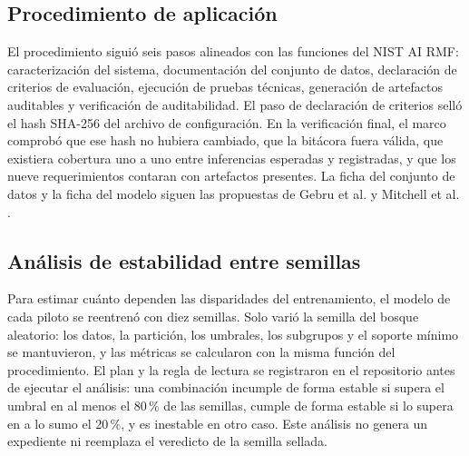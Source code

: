 \subsection{Procedimiento de aplicación}

El procedimiento siguió seis pasos alineados con las funciones del NIST AI RMF:
caracterización del sistema, documentación del conjunto de datos, declaración de
criterios de evaluación, ejecución de pruebas técnicas, generación de artefactos
auditables y verificación de auditabilidad. El paso de declaración de criterios
selló el hash SHA-256 del archivo de configuración. En la verificación final, el
marco comprobó que ese hash no hubiera cambiado, que la bitácora fuera válida,
que existiera cobertura uno a uno entre inferencias esperadas y registradas, y
que los nueve requerimientos contaran con artefactos presentes. La ficha del
conjunto de datos y la ficha del modelo siguen las propuestas de Gebru et al.
\cite{gebru2021datasheets} y Mitchell et al. \cite{mitchell2019modelcards}.

\subsection{Análisis de estabilidad entre semillas}

Para estimar cuánto dependen las disparidades del entrenamiento, el modelo de cada
piloto se reentrenó con diez semillas. Solo varió la semilla del bosque aleatorio:
los datos, la partición, los umbrales, los subgrupos y el soporte mínimo se
mantuvieron, y las métricas se calcularon con la misma función del procedimiento.
El plan y la regla de lectura se registraron en el repositorio antes de ejecutar el
análisis: una combinación incumple de forma estable si supera el umbral en al menos
el 80\,\% de las semillas, cumple de forma estable si lo supera en a lo sumo el
20\,\%, y es inestable en otro caso. Este análisis no genera un expediente ni
reemplaza el veredicto de la semilla sellada.
